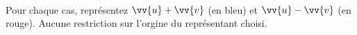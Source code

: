 \documentclass[main.tex]{subfiles}
\begin{document}
\newpage  
\begin{exercise}\hfill\\
Pour chaque cas, représentez $\vv{u}+\vv{v}$ (en bleu) et $\vv{u}-\vv{v}$ (en rouge). Aucune restriction sur l'orgine du représentant choisi.  
%			
%			
%			
%			
%			

\end{exercise}
\end{document}
